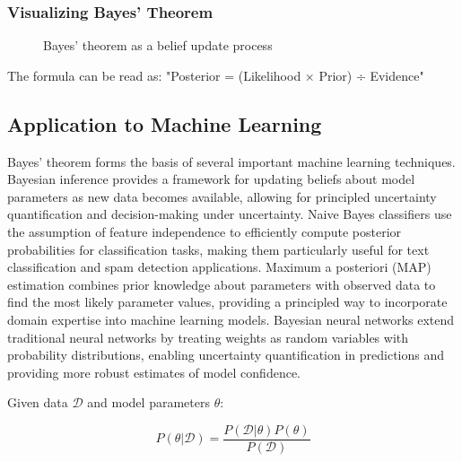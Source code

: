 \subsubsection{Visualizing Bayes' Theorem}

\begin{figure}[h]
\centering
{}
\caption{Bayes' theorem as a belief update process}
\label{fig:bayes-process}
\end{figure}

The formula can be read as: "Posterior = (Likelihood × Prior) ÷ Evidence"

\subsection{Application to Machine Learning}

Bayes' theorem forms the basis of several important machine learning techniques. Bayesian inference provides a framework for updating beliefs about model parameters as new data becomes available, allowing for principled uncertainty quantification and decision-making under uncertainty. Naive Bayes classifiers use the assumption of feature independence to efficiently compute posterior probabilities for classification tasks, making them particularly useful for text classification and spam detection applications. Maximum a posteriori (MAP) estimation combines prior knowledge about parameters with observed data to find the most likely parameter values, providing a principled way to incorporate domain expertise into machine learning models. Bayesian neural networks extend traditional neural networks by treating weights as random variables with probability distributions, enabling uncertainty quantification in predictions and providing more robust estimates of model confidence.

Given data $\mathcal{D}$ and model parameters $\theta$:

\begin{equation}
P(\theta|\mathcal{D}) = \frac{P(\mathcal{D}|\theta)P(\theta)}{P(\mathcal{D})}
\end{equation}
